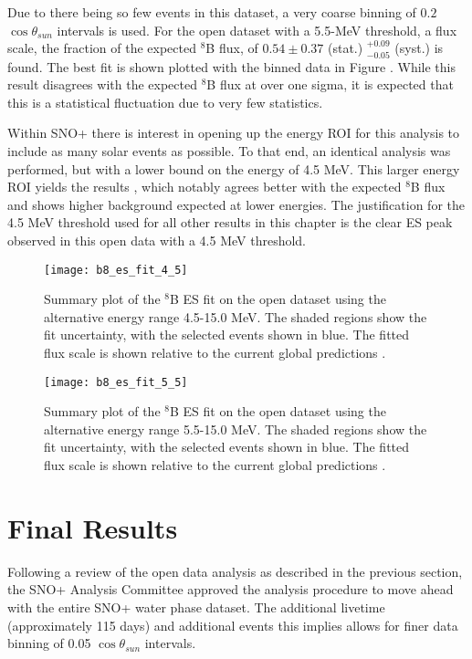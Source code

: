 Due to there being so few events in this dataset, a very coarse binning of $0.2$ $\cos{\theta_{sun}}$ intervals is used.
For the open dataset with a 5.5-MeV threshold, a flux scale, the fraction of the expected $^8$B flux, of $0.54\pm0.37$ (stat.) $^{+0.09}_{-0.05}$ (syst.) is found.
The best fit is shown plotted with the binned data in Figure .
While this result disagrees with the expected $^8$B flux at over one sigma, it is expected that this is a statistical fluctuation due to very few statistics.

Within SNO+ there is interest in opening up the energy ROI for this analysis to include as many solar events as possible.
To that end, an identical analysis was performed, but with a lower bound on the energy of 4.5 MeV.
This larger energy ROI yields the results , which notably agrees better with the expected $^8$B flux and shows higher background expected at lower energies.
The justification for the 4.5 MeV threshold used for all other results in this chapter is the clear ES peak observed in this open data with a 4.5 MeV threshold.

\begin{figure}
\centering
\texttt{[image: b8\_es\_fit\_4\_5]}
\caption{
Summary plot of the $^8$B ES fit on the open dataset using the alternative energy range 4.5-15.0 MeV.
The shaded regions show the fit uncertainty, with the selected events shown in blue.
The fitted flux scale is shown relative to the current global predictions \cite{GlobalSolarFlux}.
}
\label{fig:solar:open45}
\end{figure}

\begin{figure}
\centering
\texttt{[image: b8\_es\_fit\_5\_5]}
\caption{
Summary plot of the $^8$B ES fit on the open dataset using the alternative energy range 5.5-15.0 MeV.
The shaded regions show the fit uncertainty, with the selected events shown in blue.
The fitted flux scale is shown relative to the current global predictions \cite{GlobalSolarFlux}.
}
\label{fig:solar:open55}
\end{figure}

\clearpage

\section{Final Results}
\label{sec:solar:updated}

Following a review of the open data analysis as described in the previous section, the SNO+ Analysis Committee approved the analysis procedure to move ahead with the entire SNO+ water phase dataset.
The additional livetime (approximately 115 days) and additional events this implies allows for finer data binning of 0.05 $\cos{\theta_{sun}}$ intervals.

